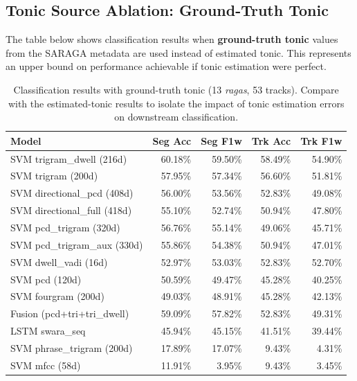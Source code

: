 \documentclass[11pt,a4paper]{article}
\begin{document}
\subsection{Tonic Source Ablation: Ground-Truth Tonic}
\label{sec:app-gt}

The table below shows classification results when \textbf{ground-truth tonic} values from the SARAGA metadata are used instead of estimated tonic. This represents an upper bound on performance achievable if tonic estimation were perfect.

\begin{table}[H]
\centering
\caption{Classification results with ground-truth tonic (13 \textit{ragas}, 53 tracks). Compare with the estimated-tonic results to isolate the impact of tonic estimation errors on downstream classification.}
\label{tab:app-gt}
\small
\begin{tabular}{lrrrr}
\toprule
\textbf{Model} & \textbf{Seg Acc} & \textbf{Seg F1w} & \textbf{Trk Acc} & \textbf{Trk F1w} \\
\midrule
SVM trigram\_dwell (216d)        & 60.18\% & 59.50\% & 58.49\% & 54.90\% \\
SVM trigram (200d)               & 57.95\% & 57.34\% & 56.60\% & 51.81\% \\
SVM directional\_pcd (408d)     & 56.00\% & 53.56\% & 52.83\% & 49.08\% \\
SVM directional\_full (418d)    & 55.10\% & 52.74\% & 50.94\% & 47.80\% \\
SVM pcd\_trigram (320d)          & 56.76\% & 55.14\% & 49.06\% & 45.71\% \\
SVM pcd\_trigram\_aux (330d)    & 55.86\% & 54.38\% & 50.94\% & 47.01\% \\
SVM dwell\_vadi (16d)            & 52.97\% & 53.03\% & 52.83\% & 52.70\% \\
SVM pcd (120d)                   & 50.59\% & 49.47\% & 45.28\% & 40.25\% \\
SVM fourgram (200d)              & 49.03\% & 48.91\% & 45.28\% & 42.13\% \\
Fusion (pcd+tri+tri\_dwell)     & 59.09\% & 57.82\% & 52.83\% & 49.31\% \\
LSTM swara\_seq                  & 45.94\% & 45.15\% & 41.51\% & 39.44\% \\
SVM phrase\_trigram (200d)       & 17.89\% & 17.07\% &  9.43\% &  4.31\% \\
SVM mfcc (58d)                   & 11.91\% &  3.95\% &  9.43\% &  3.45\% \\
\bottomrule
\end{tabular}
\end{table}
\end{document}
